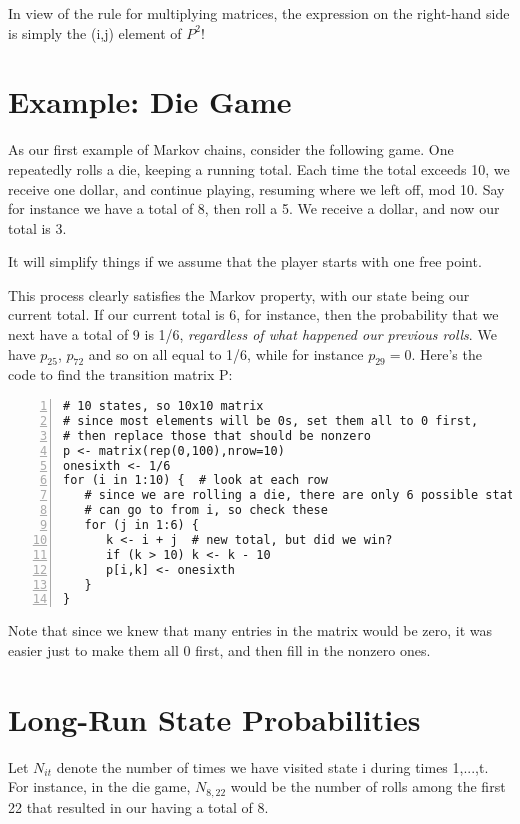 In view of the rule for multiplying matrices, the expression on the
right-hand side is simply the (i,j) element of $P^2$!

\section{Example:  Die Game}

As our first example of Markov chains, consider the following game.  One
repeatedly rolls a die, keeping a running total.  Each time the total
exceeds 10, we receive one dollar, and continue playing, resuming where
we left off, mod 10.  Say for instance we have a total of 8, then roll a
5.  We receive a dollar, and now our total is 3.

It will simplify things if we assume that the player starts with one
free point.

This process clearly satisfies the Markov property, with our state being
our current total.  If our current total is 6, for instance, then the
probability that we next have a total of 9 is 1/6, {\it regardless of
what happened our previous rolls}.  We have $p_{25}$, $p_{72}$ and so on
all equal to 1/6, while for instance $p_{29} = 0$.  Here's the code to
find the transition matrix P:

\begin{lstlisting}[numbers=left]
# 10 states, so 10x10 matrix
# since most elements will be 0s, set them all to 0 first, 
# then replace those that should be nonzero
p <- matrix(rep(0,100),nrow=10)  
onesixth <- 1/6
for (i in 1:10) {  # look at each row
   # since we are rolling a die, there are only 6 possible states we 
   # can go to from i, so check these
   for (j in 1:6) {  
      k <- i + j  # new total, but did we win?
      if (k > 10) k <- k - 10 
      p[i,k] <- onesixth
   }
}
\end{lstlisting}

Note that since we knew that many entries in the matrix would be zero, it
was easier just to make them all 0 first, and then fill in the nonzero
ones.

\section{Long-Run State Probabilities}

Let $N_{it}$ denote the number of times we have visited state i during
times 1,...,t.  For instance, in the die game, $N_{8,22}$ would be the
number of rolls among the first 22 that resulted in our having a total
of 8.

